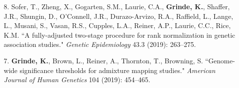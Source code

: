 \documentclass[margin]{res}
\begin{document}
\begin{resume}
\begin{itemize}
\item[8.] Sofer, T., Zheng, X., Gogarten, S.M., Laurie, C.A., \textbf{Grinde, K.}, Shaffer, J.R., Shungin, D., O'Connell, J.R., Durazo-Arvizo, R.A., Raffield, L., Lange, L., Musani, S., Vasan, R.S., Cupples, L.A., Reiner, A.P., Laurie, C.C., Rice, K.M. ``A fully-adjusted two-stage procedure for rank normalization in genetic association studies." \textit{Genetic Epidemiology} 43.3 (2019): 263--275.

\item[7.] \textbf{Grinde, K.}, Brown, L., Reiner, A., Thornton, T., Browning, S. ``Genome-wide significance thresholds for admixture mapping studies." \textit{American Journal of Human Genetics} 104 (2019): 454--465. 


\end{itemize}
\end{resume}
\end{document}
